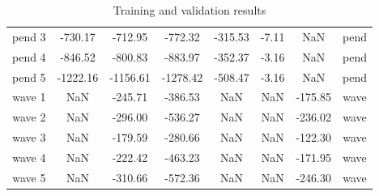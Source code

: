 \documentclass[twoside]{article}
\begin{document}
\begin{table}[H]
\begin{tabular}{|c|c|c|c|c|c|c|c|}
pend 3 &  -730.17 &  -712.95 &  -772.32 & -315.53 & -7.11 & NaN & pend\\
pend 4 &  -846.52 &  -800.83 &  -883.97 & -352.37 & -3.16 & NaN & pend\\
pend 5 & -1222.16 & -1156.61 & -1278.42 & -508.47 & -3.16 & NaN & pend\\\hline\hline
wave 1 & NaN & -245.71 & -386.53 & NaN & NaN & -175.85 & wave\\
wave 2 & NaN & -296.00 & -536.27 & NaN & NaN & -236.02 & wave\\
wave 3 & NaN & -179.59 & -280.66 & NaN & NaN & -122.30 & wave\\
wave 4 & NaN & -222.42 & -463.23 & NaN & NaN & -171.95 & wave\\
wave 5 & NaN & -310.66 & -572.36 & NaN & NaN & -246.30 & wave\\\hline
\end{tabular}
\caption{Training and validation results}
\label{table:result}
\end{table}
\end{document}
